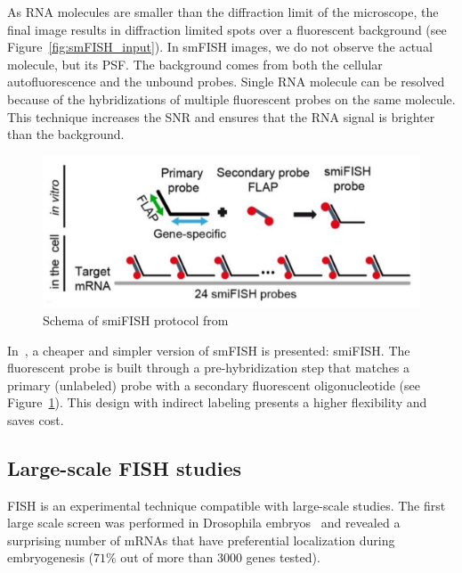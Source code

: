 \noindent
As \ac{RNA} molecules are smaller than the diffraction limit of the microscope, the final image results in diffraction limited spots over a fluorescent background (see Figure~\ref{fig:smFISH_input}).
In \ac{smFISH} images, we do not observe the actual molecule, but its \ac{PSF}.
The background comes from both the cellular autofluorescence and the unbound probes.
Single \ac{RNA} molecule can be resolved because of the hybridizations of multiple fluorescent probes on the same molecule.
This technique increases the \ac{SNR} and ensures that the \ac{RNA} signal is brighter than the background.

\begin{figure}
	\begin{center}
	\includegraphics[width=\linewidth]{figures/introduction/smiFISH}
	\caption[Schema of smiFISH protocol]{Schema of smiFISH protocol from~\cite{tsanov_smifish_2016}}
	\label{fig:smiFISH}
	\end{center}
\end{figure}

In~\cite{tsanov_smifish_2016}, a cheaper and simpler version of \ac{smFISH} is presented: \ac{smiFISH}.
The fluorescent probe is built through a pre-hybridization step that matches a primary (unlabeled) probe with a secondary fluorescent oligonucleotide (see Figure~\ref{fig:smiFISH}).
This design with indirect labeling presents a higher flexibility and saves cost.

\subsection{Large-scale FISH studies}
\label{subsec:intro_scale_fish}

FISH is an experimental technique compatible with large-scale studies. The first large scale screen was performed in Drosophila embryos~\cite{lecuyer_global_2007} and revealed a surprising number of mRNAs that have preferential localization during embryogenesis ($71\%$ out of more than 3000 genes tested). 

